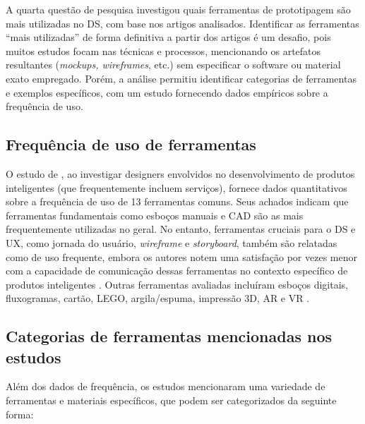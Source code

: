 A quarta questão de pesquisa investigou quais ferramentas de prototipagem são mais utilizadas no DS, com base nos artigos analisados. Identificar as ferramentas ``mais utilizadas'' de forma definitiva a partir dos artigos é um desafio, pois muitos estudos focam nas técnicas e processos, mencionando os artefatos resultantes (\textit{mockups, wireframes}, etc.) sem especificar o software ou material exato empregado. Porém, a análise permitiu identificar categorias de ferramentas e exemplos específicos, com um estudo  fornecendo dados empíricos sobre a frequência de uso.

\subsection{Frequência de uso de ferramentas}

O estudo de , ao investigar designers envolvidos no desenvolvimento de produtos inteligentes (que frequentemente incluem serviços), fornece dados quantitativos sobre a frequência de uso de 13 ferramentas comuns. Seus achados indicam que ferramentas fundamentais como esboços manuais e CAD são as mais frequentemente utilizadas no geral. No entanto, ferramentas cruciais para o DS e UX, como jornada do usuário, \textit{wireframe} e \textit{storyboard}, também são relatadas como de uso frequente, embora os autores notem uma satisfação por vezes menor com a capacidade de comunicação dessas ferramentas no contexto específico de produtos inteligentes \cite{wang2023smartproducts}. Outras ferramentas avaliadas incluíram esboços digitais, fluxogramas, cartão, LEGO, argila/espuma, impressão 3D, AR e VR \cite{wang2023smartproducts}.

\subsection{Categorias de ferramentas mencionadas nos estudos}

Além dos dados de frequência, os estudos mencionaram uma variedade de ferramentas e materiais específicos, que podem ser categorizados da seguinte forma:

